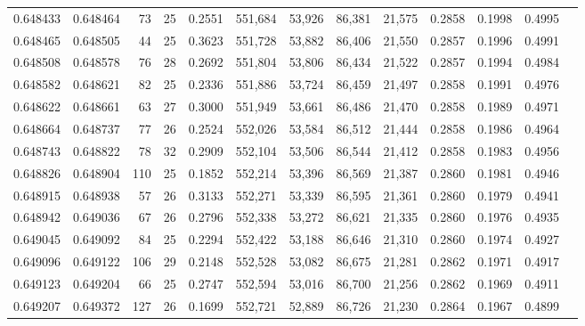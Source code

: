 \begin{tabular}{rrrrrrrrrrrrr}
0.648433 & 0.648464 &  73 &  25 &                                     0.2551 & 551,684 &  53,926 &  86,381 &  21,575 & 0.2858 & 0.1998 & 0.4995 \\
0.648465 & 0.648505 &  44 &  25 &                                     0.3623 & 551,728 &  53,882 &  86,406 &  21,550 & 0.2857 & 0.1996 & 0.4991 \\
0.648508 & 0.648578 &  76 &  28 &                                     0.2692 & 551,804 &  53,806 &  86,434 &  21,522 & 0.2857 & 0.1994 & 0.4984 \\
0.648582 & 0.648621 &  82 &  25 &                                     0.2336 & 551,886 &  53,724 &  86,459 &  21,497 & 0.2858 & 0.1991 & 0.4976 \\
0.648622 & 0.648661 &  63 &  27 &                                     0.3000 & 551,949 &  53,661 &  86,486 &  21,470 & 0.2858 & 0.1989 & 0.4971 \\
0.648664 & 0.648737 &  77 &  26 &                                     0.2524 & 552,026 &  53,584 &  86,512 &  21,444 & 0.2858 & 0.1986 & 0.4964 \\
0.648743 & 0.648822 &  78 &  32 &                                     0.2909 & 552,104 &  53,506 &  86,544 &  21,412 & 0.2858 & 0.1983 & 0.4956 \\
0.648826 & 0.648904 & 110 &  25 &                                     0.1852 & 552,214 &  53,396 &  86,569 &  21,387 & 0.2860 & 0.1981 & 0.4946 \\
0.648915 & 0.648938 &  57 &  26 &                                     0.3133 & 552,271 &  53,339 &  86,595 &  21,361 & 0.2860 & 0.1979 & 0.4941 \\
0.648942 & 0.649036 &  67 &  26 &                                     0.2796 & 552,338 &  53,272 &  86,621 &  21,335 & 0.2860 & 0.1976 & 0.4935 \\
0.649045 & 0.649092 &  84 &  25 &                                     0.2294 & 552,422 &  53,188 &  86,646 &  21,310 & 0.2860 & 0.1974 & 0.4927 \\
0.649096 & 0.649122 & 106 &  29 &                                     0.2148 & 552,528 &  53,082 &  86,675 &  21,281 & 0.2862 & 0.1971 & 0.4917 \\
0.649123 & 0.649204 &  66 &  25 &                                     0.2747 & 552,594 &  53,016 &  86,700 &  21,256 & 0.2862 & 0.1969 & 0.4911 \\
0.649207 & 0.649372 & 127 &  26 &                                     0.1699 & 552,721 &  52,889 &  86,726 &  21,230 & 0.2864 & 0.1967 & 0.4899 \\

\end{tabular}
